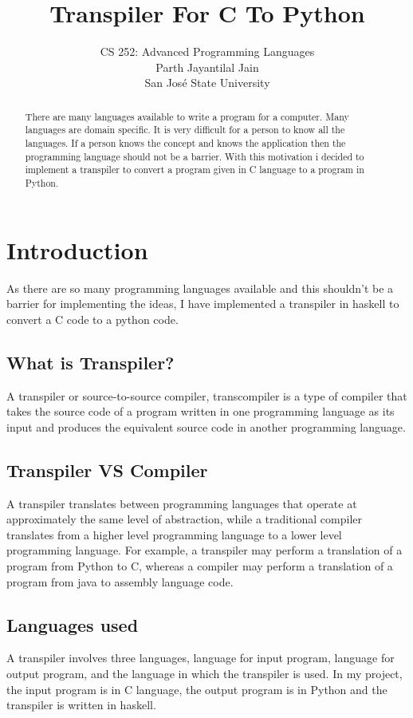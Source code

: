 \documentclass{article}
\title{\textbf{Transpiler For C To Python}}
\author{CS 252: Advanced Programming Languages \\
  Parth Jayantilal Jain \\
  San Jos\'{e} State University \\}
\begin{document}
\maketitle
\newpage
\begin{abstract}
There are many languages available to write a program for a computer. Many languages are domain specific. It is very difficult for a person to know all the languages. If a person knows the concept and knows the application then the programming language should not be a barrier. With this motivation i decided to implement a transpiler to convert a program given in C language to a program in Python.
\end{abstract}
\newpage
\tableofcontents

\newpage
\section{Introduction}
As there are so many programming languages available and this shouldn't be a barrier for implementing the ideas, I have implemented a transpiler in haskell to convert a C code to a python code. 
\subsection{What is Transpiler?}
A transpiler or source-to-source compiler, transcompiler is a type of compiler that takes
the source code of a program written in one programming language as its input and
produces the equivalent source code in another programming language.\cite{transpiler}
\subsection{Transpiler VS Compiler}
A transpiler translates between programming languages that operate at approximately
the same level of abstraction, while a traditional compiler translates from a higher level
programming language to a lower level programming language. For example, a
transpiler may perform a translation of a program from Python to C, whereas a compiler may perform a translation of a program from java to assembly language code.\cite{transpiler}
\subsection{Languages used}
A transpiler involves three languages, language for input program, language for output program, and the language in which the transpiler is used. In my project, the input program is in C language, the output program is in Python and the transpiler is written in haskell.
\end{document}
